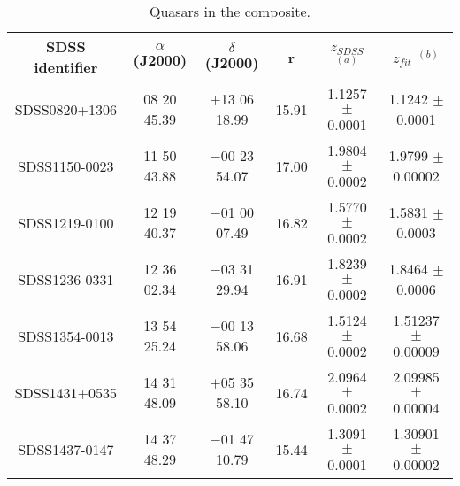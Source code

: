 \begin{table*}
\centering
\begin{center}
\caption{Quasars in the composite. \label{tab:targets}}
\begin{tabular}{cccccc}
\hline
\noalign{\smallskip}
SDSS identifier & $\alpha$(J2000) & $\delta$(J2000) & r &  $z_{SDSS}$ $^{(a)}$  &  $z_{fit}$ $^{(b)}$ \\  
\hline

SDSS0820+1306  & 08 20 45.39 & $+$13 06 18.99 & 15.91 & 1.1257 $\pm$ 0.0001 & 1.1242 $\pm$ 0.0001        \\
SDSS1150-0023  & 11 50 43.88 & $-$00 23 54.07 & 17.00 & 1.9804 $\pm$ 0.0002 & 1.9799 $\pm$ 0.00002       \\
SDSS1219-0100  & 12 19 40.37& $-$01 00 07.49& 16.82 & 1.5770 $\pm$ 0.0002  & 1.5831 $\pm$ 0.0003       \\
SDSS1236-0331  & 12 36 02.34 & $-$03 31 29.94 & 16.91 & 1.8239 $\pm$ 0.0002   & 1.8464 $\pm$ 0.0006        \\
SDSS1354-0013  & 13 54 25.24 & $-$00 13 58.06 & 16.68 & 1.5124 $\pm$ 0.0002 & 1.51237 $\pm$  0.00009         \\
SDSS1431+0535  & 14 31 48.09 & $+$05 35 58.10 & 16.74 & 2.0964 $\pm$ 0.0002 & 2.09985 $\pm$  0.00004     \\
SDSS1437-0147  & 14 37 48.29 & $-$01 47 10.79 & 15.44 & 1.3091 $\pm$ 0.0001& 1.30901 $\pm$  0.00002        \\

\hline
\hline
\end{tabular}
\end{center}


\end{table*}



